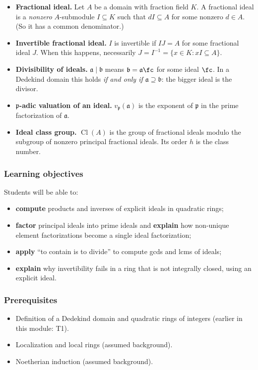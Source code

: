 \documentclass[11pt]{article}
\newcommand{\fp}{\mathfrak{p}}
\newcommand{\fa}{\mathfrak{a}}
\newcommand{\fb}{\mathfrak{b}}
\DeclareMathOperator{\Cl}{Cl}
\begin{document}
\begin{keydefs}
\begin{itemize}
  \item \textbf{Fractional ideal.} Let $A$ be a domain with fraction field $K$. A fractional ideal is a \emph{nonzero} $A$-submodule $I\subseteq K$ such that $dI\subseteq A$ for some nonzero $d\in A$. (So it has a common denominator.)
  \item \textbf{Invertible fractional ideal.} $I$ is invertible if $IJ=A$ for some fractional ideal $J$. When this happens, necessarily $J=I^{-1}=\{x\in K: xI\subseteq A\}$.
  \item \textbf{Divisibility of ideals.} $\fa\mid\fb$ means $\fb=\fa\fc$ for some ideal $\fc$. In a Dedekind domain this holds \emph{if and only if $\fa\supseteq\fb$}: the bigger ideal is the divisor.
  \item \textbf{$\fp$-adic valuation of an ideal.} $v_\fp(\fa)$ is the exponent of $\fp$ in the prime factorization of $\fa$.
  \item \textbf{Ideal class group.} $\Cl(A)$ is the group of fractional ideals modulo the subgroup of nonzero principal fractional ideals. Its order $h$ is the class number.
\end{itemize}
\end{keydefs}

\subsubsection*{Learning objectives}
Students will be able to:
\begin{itemize}
  \item \textbf{compute} products and inverses of explicit ideals in quadratic rings;
  \item \textbf{factor} principal ideals into prime ideals and \textbf{explain} how non-unique element factorizations become a single ideal factorization;
  \item \textbf{apply} ``to contain is to divide'' to compute gcds and lcms of ideals;
  \item \textbf{explain} why invertibility fails in a ring that is not integrally closed, using an explicit ideal.
\end{itemize}

\subsubsection*{Prerequisites}
\begin{itemize}
  \item Definition of a Dedekind domain and quadratic rings of integers (earlier in this module: T1).
  \item Localization and local rings (assumed background).
  \item Noetherian induction (assumed background).
\end{itemize}
\end{document}
